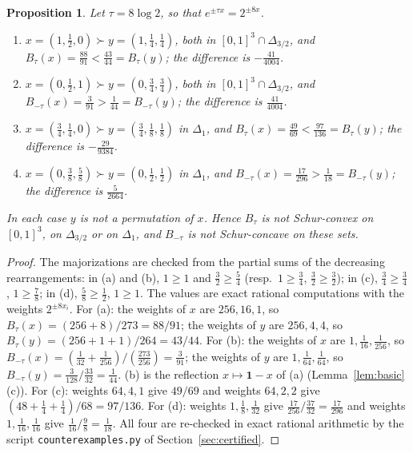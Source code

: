 \documentclass[11pt,a4paper]{article}
\theoremstyle{plain}
\newtheorem{proposition}[theorem]{Proposition}
\theoremstyle{definition}
\newcommand{\one}{\mathbf{1}}
\newcommand{\maj}{\succ}
\newcommand{\Simp}{\Delta}
\begin{document}
\begin{proposition}\label{prop:witness}
Let $\tau=8\log 2$, so that $e^{\pm\tau x}=2^{\pm 8x}$.
\begin{enumerate}
\item[(a)] $x=(1,\tfrac12,0)\maj y=(1,\tfrac14,\tfrac14)$, both in $[0,1]^3\cap\Simp_{3/2}$, and $B_\tau(x)=\tfrac{88}{91}<\tfrac{43}{44}=B_\tau(y)$; the difference is $-\tfrac{41}{4004}$.
\item[(b)] $x=(0,\tfrac12,1)\maj y=(0,\tfrac34,\tfrac34)$, both in $[0,1]^3\cap\Simp_{3/2}$, and $B_{-\tau}(x)=\tfrac{3}{91}>\tfrac{1}{44}=B_{-\tau}(y)$; the difference is $\tfrac{41}{4004}$.
\item[(c)] $x=(\tfrac34,\tfrac14,0)\maj y=(\tfrac34,\tfrac18,\tfrac18)$ in $\Simp_1$, and $B_\tau(x)=\tfrac{49}{69}<\tfrac{97}{136}=B_\tau(y)$; the difference is $-\tfrac{29}{9384}$.
\item[(d)] $x=(0,\tfrac38,\tfrac58)\maj y=(0,\tfrac12,\tfrac12)$ in $\Simp_1$, and $B_{-\tau}(x)=\tfrac{17}{296}>\tfrac{1}{18}=B_{-\tau}(y)$; the difference is $\tfrac{5}{2664}$.
\end{enumerate}
In each case $y$ is not a permutation of $x$. Hence $B_\tau$ is not Schur-convex on $[0,1]^3$, on $\Simp_{3/2}$ or on $\Simp_1$, and $B_{-\tau}$ is not Schur-concave on these sets.
\end{proposition}

\begin{proof}
The majorizations are checked from the partial sums of the decreasing rearrangements: in (a) and (b), $1\ge 1$ and $\tfrac32\ge\tfrac54$ (resp.\ $1\ge\tfrac34$, $\tfrac32\ge\tfrac32$); in (c), $\tfrac34\ge\tfrac34$, $1\ge\tfrac78$; in (d), $\tfrac58\ge\tfrac12$, $1\ge 1$. The values are exact rational computations with the weights $2^{\pm 8x_i}$. For (a): the weights of $x$ are $256,16,1$, so $B_\tau(x)=(256+8)/273=88/91$; the weights of $y$ are $256,4,4$, so $B_\tau(y)=(256+1+1)/264=43/44$. For (b): the weights of $x$ are $1,\tfrac1{16},\tfrac1{256}$, so $B_{-\tau}(x)=(\tfrac1{32}+\tfrac1{256})/(\tfrac{273}{256})=\tfrac{3}{91}$; the weights of $y$ are $1,\tfrac1{64},\tfrac1{64}$, so $B_{-\tau}(y)=\tfrac{3}{128}/\tfrac{33}{32}=\tfrac1{44}$. (b) is the reflection $x\mapsto\one-x$ of (a) (Lemma~\ref{lem:basic}(c)). For (c): weights $64,4,1$ give $49/69$ and weights $64,2,2$ give $(48+\tfrac14+\tfrac14)/68=97/136$. For (d): weights $1,\tfrac18,\tfrac1{32}$ give $\tfrac{17}{256}/\tfrac{37}{32}=\tfrac{17}{296}$ and weights $1,\tfrac1{16},\tfrac1{16}$ give $\tfrac1{16}/\tfrac98=\tfrac1{18}$. All four are re-checked in exact rational arithmetic by the script \texttt{counterexamples.py} of Section~\ref{sec:certified}.
\end{proof}
\end{document}
